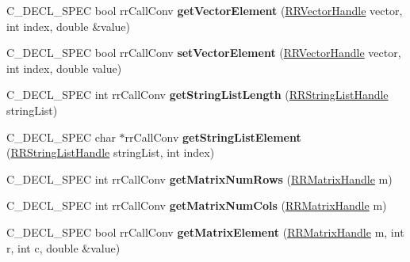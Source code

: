 \begin{DoxyCompactItemize}
\item 
\hypertarget{group__loadsave_gaf06c28a1e29d86f3fd3e6112eb7c85e8}{
\-C\-\_\-\-D\-E\-C\-L\-\_\-\-S\-P\-E\-C bool rr\-Call\-Conv {\bfseries get\-Vector\-Element} (\hyperlink{struct_r_r_vector}{\-R\-R\-Vector\-Handle} vector, int index, double \&value)}
\label{group__loadsave_gaf06c28a1e29d86f3fd3e6112eb7c85e8}

\item 
\hypertarget{group__loadsave_ga77eaf0d0f88175ce4e2e8ca57ff9d859}{
\-C\-\_\-\-D\-E\-C\-L\-\_\-\-S\-P\-E\-C bool rr\-Call\-Conv {\bfseries set\-Vector\-Element} (\hyperlink{struct_r_r_vector}{\-R\-R\-Vector\-Handle} vector, int index, double value)}
\label{group__loadsave_ga77eaf0d0f88175ce4e2e8ca57ff9d859}

\item 
\hypertarget{group__loadsave_ga451b4f6fe1d5aaabfdd11acb44f124bb}{
\-C\-\_\-\-D\-E\-C\-L\-\_\-\-S\-P\-E\-C int rr\-Call\-Conv {\bfseries get\-String\-List\-Length} (\hyperlink{struct_r_r_string_list}{\-R\-R\-String\-List\-Handle} string\-List)}
\label{group__loadsave_ga451b4f6fe1d5aaabfdd11acb44f124bb}

\item 
\hypertarget{group__loadsave_gac305395b75de8e66270d552492ff7df0}{
\-C\-\_\-\-D\-E\-C\-L\-\_\-\-S\-P\-E\-C char $\ast$rr\-Call\-Conv {\bfseries get\-String\-List\-Element} (\hyperlink{struct_r_r_string_list}{\-R\-R\-String\-List\-Handle} string\-List, int index)}
\label{group__loadsave_gac305395b75de8e66270d552492ff7df0}

\item 
\hypertarget{group__loadsave_gad5a3803c72d8f27bf2dad72b25226675}{
\-C\-\_\-\-D\-E\-C\-L\-\_\-\-S\-P\-E\-C int rr\-Call\-Conv {\bfseries get\-Matrix\-Num\-Rows} (\hyperlink{struct_r_r_matrix}{\-R\-R\-Matrix\-Handle} m)}
\label{group__loadsave_gad5a3803c72d8f27bf2dad72b25226675}

\item 
\hypertarget{group__loadsave_ga46eae843e223f83e00b07fe7563a1c91}{
\-C\-\_\-\-D\-E\-C\-L\-\_\-\-S\-P\-E\-C int rr\-Call\-Conv {\bfseries get\-Matrix\-Num\-Cols} (\hyperlink{struct_r_r_matrix}{\-R\-R\-Matrix\-Handle} m)}
\label{group__loadsave_ga46eae843e223f83e00b07fe7563a1c91}

\item 
\hypertarget{group__loadsave_gac4bd2fdc7fd7d3a1f52ef59975952dad}{
\-C\-\_\-\-D\-E\-C\-L\-\_\-\-S\-P\-E\-C bool rr\-Call\-Conv {\bfseries get\-Matrix\-Element} (\hyperlink{struct_r_r_matrix}{\-R\-R\-Matrix\-Handle} m, int r, int c, double \&value)}
\label{group__loadsave_gac4bd2fdc7fd7d3a1f52ef59975952dad}


\end{DoxyCompactItemize}
